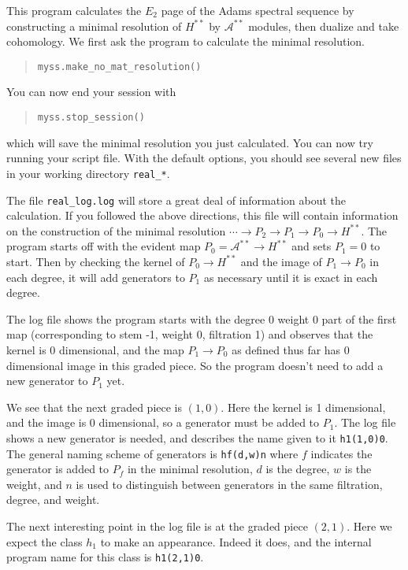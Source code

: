 \documentclass{article}
\begin{document}
This program calculates the $E_2$ page of the Adams spectral sequence
by constructing a minimal resolution of $H^{**}$ by $\mathcal{A}^{**}$
modules, then dualize and take cohomology. We first ask the program to
calculate the minimal resolution.
\begin{quote}
\begin{verbatim}
myss.make_no_mat_resolution()
\end{verbatim}
\end{quote}
You can now end your session with
\begin{quote}
\begin{verbatim}
myss.stop_session()
\end{verbatim}
\end{quote}
which will save the minimal resolution you just calculated. You can
now try running your script file. With the default options, you should
see several new files in your working directory \texttt{real\_*}.

The file \texttt{real\_log.log} will store a great deal of information
about the calculation. If you followed the above directions, this file
will contain information on the construction of the minimal resolution
$\cdots \to P_2 \to P_1 \to P_0 \to H^{**}$. The program starts off
with the evident map $P_0 = \mathcal{A}^{**} \to H^{**}$ and sets
$P_1 = 0$ to start. Then by checking the kernel of $P_0 \to H^{**}$
and the image of $P_1 \to P_0$ in each degree, it will add generators
to $P_1$ as necessary until it is exact in each degree.

The log file shows the program starts with the degree 0 weight 0 part
of the first map (corresponding to stem -1, weight 0, filtration 1)
and observes that the kernel is 0 dimensional, and the map
$P_1 \to P_0$ as defined thus far has 0 dimensional image in this
graded piece. So the program doesn't need to add a new generator to
$P_1$ yet.

We see that the next graded piece is $(1,0)$. Here the kernel is 1
dimensional, and the image is 0 dimensional, so a generator must be
added to $P_1$. The log file shows a new generator is needed, and
describes the name given to it \texttt{h1(1,0)0}. The general naming
scheme of generators is \texttt{hf(d,w)n} where $f$ indicates the
generator is added to $P_f$ in the minimal resolution, $d$ is the
degree, $w$ is the weight, and $n$ is used to distinguish between
generators in the same filtration, degree, and weight.

The next interesting point in the log file is at the graded piece
$(2,1)$. Here we expect the class $h_1$ to make an appearance. Indeed
it does, and the internal program name for this class is
\texttt{h1(2,1)0}.
\end{document}

